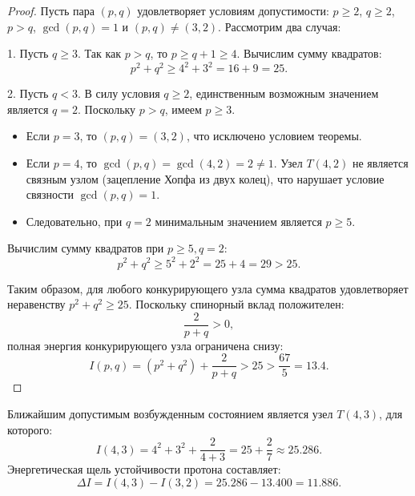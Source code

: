 \documentclass[11pt,a4paper]{article}
\theoremstyle{definition}
\theoremstyle{remark}
\begin{document}
\begin{proof}
Пусть пара $(p, q)$ удовлетворяет условиям допустимости: $p \ge 2$, $q \ge 2$, $p > q$, $\gcd(p, q) = 1$ и $(p, q) \ne (3, 2)$. Рассмотрим два случая:

1. Пусть $q \ge 3$. Так как $p > q$, то $p \ge q + 1 \ge 4$. Вычислим сумму квадратов:
\begin{equation}
	p^2 + q^2 \ge 4^2 + 3^2 = 16 + 9 = 25.
\end{equation}
		
2. Пусть $q < 3$. В силу условия $q \ge 2$, единственным возможным значением является $q = 2$.
Поскольку $p > q$, имеем $p \ge 3$.
\begin{itemize}
\item Если $p = 3$, то $(p, q) = (3, 2)$, что исключено условием теоремы.
\item Если $p = 4$, то $\gcd(p, q) = \gcd(4, 2) = 2 \ne 1$. Узел $T(4,2)$ не является связным узлом (зацепление Хопфа из двух колец), что нарушает условие связности $\gcd(p, q) = 1$.
\item Следовательно, при $q = 2$ минимальным значением является $p \ge 5$.
\end{itemize}
Вычислим сумму квадратов при $p \ge 5, q = 2$:
\begin{equation}
	p^2 + q^2 \ge 5^2 + 2^2 = 25 + 4 = 29 > 25.
\end{equation}
		
Таким образом, для любого конкурирующего узла сумма квадратов удовлетворяет неравенству $p^2 + q^2 \ge 25$.
Поскольку спинорный вклад положителен:
\begin{equation}
	\frac{2}{p + q} > 0,
\end{equation}
	полная энергия конкурирующего узла ограничена снизу:
\begin{equation}
	I(p, q) = (p^2 + q^2) + \frac{2}{p + q} > 25 > \frac{67}{5} = 13.4.
\end{equation}
\end{proof}
	
Ближайшим допустимым возбужденным состоянием является узел $T(4,3)$, для которого:
\begin{equation}
I(4, 3) = 4^2 + 3^2 + \frac{2}{4 + 3} = 25 + \frac{2}{7} \approx 25.286.
\label{eq:knot_4_3_energy}
\end{equation}
	Энергетическая щель устойчивости протона составляет:
\begin{equation}
\Delta I = I(4, 3) - I(3, 2) = 25.286 - 13.400 = 11.886.
\label{eq:trefoil_stability_gap}
\end{equation}
	
\end{document}
